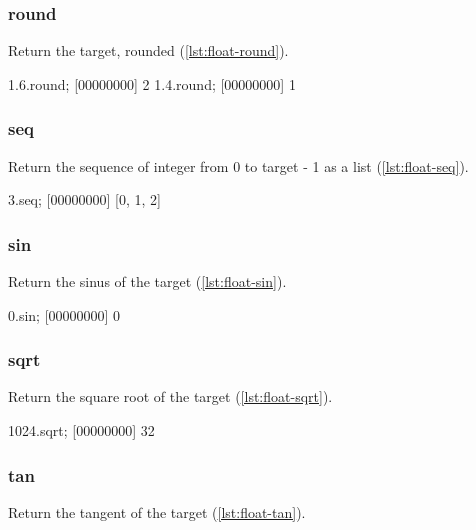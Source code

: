 \subsubsection{round}

Return the target, rounded (\autoref{lst:float-round}).

\begin{urbiscript}[caption=Float.round, label=lst:float-round,
  float=\floatposh]
1.6.round;
[00000000] 2
1.4.round;
[00000000] 1
\end{urbiscript}

\subsubsection{seq}

Return the sequence of integer from 0 to target - 1 as a list (\autoref{lst:float-seq}).

\begin{urbiscript}[caption=Float.seq, label=lst:float-seq,
  float=\floatposh]
3.seq;
[00000000] [0, 1, 2]
\end{urbiscript}

\subsubsection{sin}

Return the sinus of the target (\autoref{lst:float-sin}).

\begin{urbiscript}[caption=Float.sin, label=lst:float-sin,
  float=\floatposh]
0.sin;
[00000000] 0
\end{urbiscript}

\subsubsection{sqrt}

Return the square root of the target (\autoref{lst:float-sqrt}).

\begin{urbiscript}[caption=Float.sqrt, label=lst:float-sqrt,
  float=\floatposh]
1024.sqrt;
[00000000] 32
\end{urbiscript}

\subsubsection{tan}

Return the tangent of the target (\autoref{lst:float-tan}).

